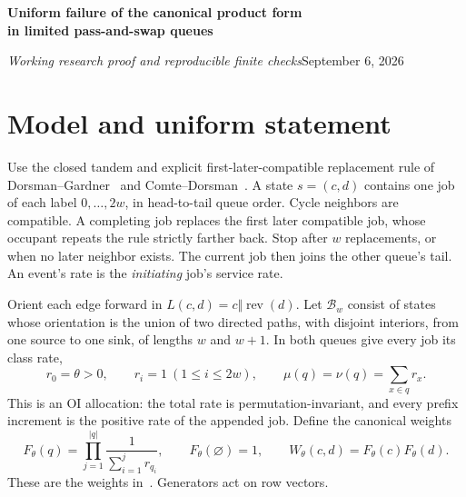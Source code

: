 \documentclass[11pt]{article}
\newcommand{\rev}{\operatorname{rev}}
\newcommand{\B}{\mathcal B_w}
\newcommand{\W}{W_\theta}
\newcommand{\F}{F_\theta}
\begin{document}
\thispagestyle{plain}
{\Large\bfseries Uniform failure of the canonical product form\\[3pt]
in limited pass-and-swap queues}\par
\textit{Working research proof and reproducible finite checks}\hfill September 6, 2026

\begin{abstract}
For every finite swap limit $w\ge2$, we give identical, strictly positive service allocations on a closed tandem with swapping graph $C_{2w+1}$ for which the canonical OI product form fails on a single recurrent class. The class consists of balanced orientations with branch lengths $w,w+1$. We prove its irreducibility under positive service at every position. With one class at rate two and every other class at rate one, the unnormalized stationary-balance defect at an explicit state is $-w/(2w+2)!$. More generally, every nonunit rate of the distinguished class gives a nonzero defect. The calculation compares limited and unlimited dynamics: exactly two incoming head-completion flows exchange destinations. The proof uses no stationary-distribution solver or extrapolation from finite tests.
\end{abstract}

\section{Model and uniform statement}
Use the closed tandem and explicit first-later-compatible replacement rule of Dorsman--Gardner~\cite{DG} and Comte--Dorsman~\cite{CD}. A state $s=(c,d)$ contains one job of each label $0,\ldots,2w$, in head-to-tail queue order. Cycle neighbors are compatible. A completing job replaces the first later compatible job, whose occupant repeats the rule strictly farther back. Stop after $w$ replacements, or when no later neighbor exists. The current job then joins the other queue's tail. An event's rate is the \emph{initiating} job's service rate.

Orient each edge forward in $L(c,d)=c\Vert\rev(d)$. Let $\B$ consist of states whose orientation is the union of two directed paths, with disjoint interiors, from one source to one sink, of lengths $w$ and $w+1$. In both queues give every job its class rate,
\[
 r_0=\theta>0,\qquad r_i=1\ (1\le i\le2w),\qquad
 \mu(q)=\nu(q)=\sum_{x\in q}r_x.
\]
This is an OI allocation: the total rate is permutation-invariant, and every prefix increment is the positive rate of the appended job. Define the canonical weights
\[
 \F(q)=\prod_{j=1}^{|q|}\frac{1}{\sum_{i=1}^{j}r_{q_i}},\qquad
 \F(\varnothing)=1,\qquad \W(c,d)=\F(c)\F(d).
\]
These are the weights in~\cite[Theorem 3 and Eq.\ (25)]{DG}. Generators act on row vectors.
\end{document}
